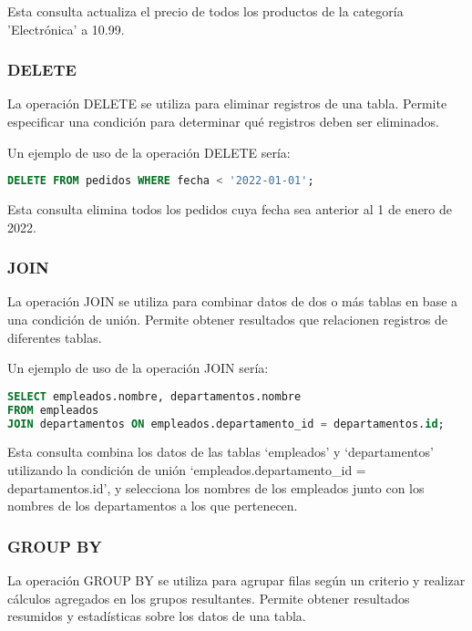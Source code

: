 \documentclass[executivepaper]{article}
\begin{document}
Esta consulta actualiza el precio de todos los productos de la categoría 'Electrónica' a 10.99.

\subsubsection*{DELETE}

La operación DELETE se utiliza para eliminar registros de una tabla. Permite especificar una condición para determinar qué registros deben ser eliminados.

Un ejemplo de uso de la operación DELETE sería:

\begin{lstlisting}[language=SQL]
DELETE FROM pedidos WHERE fecha < '2022-01-01';
\end{lstlisting}

Esta consulta elimina todos los pedidos cuya fecha sea anterior al 1 de enero de 2022.

\subsubsection*{JOIN}

La operación JOIN se utiliza para combinar datos de dos o más tablas en base a una condición de unión. Permite obtener resultados que relacionen registros de diferentes tablas.

Un ejemplo de uso de la operación JOIN sería:

\begin{lstlisting}[language=SQL]
SELECT empleados.nombre, departamentos.nombre
FROM empleados
JOIN departamentos ON empleados.departamento_id = departamentos.id;
\end{lstlisting}

Esta consulta combina los datos de las tablas \enquote*{empleados} y \enquote*{departamentos} utilizando la condición de unión \enquote*{empleados.departamento\_id = departamentos.id}, y selecciona los nombres de los empleados junto con los nombres de los departamentos a los que pertenecen.

\subsubsection*{GROUP BY}

La operación GROUP BY se utiliza para agrupar filas según un criterio y realizar cálculos agregados en los grupos resultantes. Permite obtener resultados resumidos y estadísticas sobre los datos de una tabla.
\end{document}
